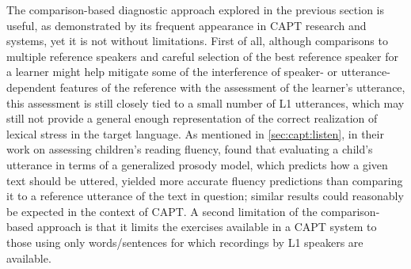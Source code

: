 	
	
	
	The comparison-based diagnostic approach explored in the previous section is useful, as demonstrated by its frequent appearance in CAPT research and systems, yet it is not without limitations. First of all, although comparisons to multiple reference speakers and careful selection of the best reference speaker for a learner might help mitigate some of the interference of speaker- or utterance-dependent features of the reference with the assessment of the learner's utterance, this assessment is still closely tied to a small number of L1 utterances, which may still not provide a general enough representation of the correct realization of lexical stress in the target language. 
	 As mentioned in \cref{sec:capt:listen}, in their work on assessing children's reading fluency, \textcite{Duong2011} found that evaluating a child's utterance in terms of a generalized prosody model, which predicts how a given text should be uttered, yielded more accurate fluency predictions than comparing it to a reference utterance of the text in question; similar results could reasonably be expected in the context of CAPT.
	A second limitation of the comparison-based approach is that 
	it limits the exercises available in a CAPT system to those using only words/sentences for which recordings by L1 speakers are available.
	
